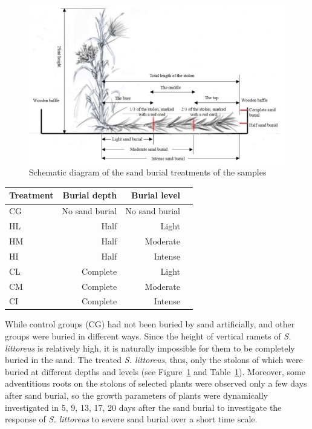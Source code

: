\documentclass[]{interact}
\theoremstyle{plain}%
\theoremstyle{definition}
\theoremstyle{remark}
\begin{document}
\begin{figure}
  \centering
  \includegraphics[scale=0.5]{../figs/diagram.jpg}
  \caption{Schematic diagram of the sand burial treatments of the samples} 
  \label{fig:diagram}
\end{figure}

\begin{table}
  {\begin{tabular}{lrrr} 
  \toprule
   Treatment & Burial depth & Burial level \\ 
  \midrule
   CG & No sand burial & No sand burial \\
   HL & Half & Light \\
   HM & Half & Moderate \\
   HI & Half & Intense \\
   CL & Complete & Light \\
   CM & Complete & Moderate \\
   CI & Complete & Intense \\
  \bottomrule
  \end{tabular}}
  \label{tab:treatment}
\end{table}

While control groups (CG) had not been buried by sand artificially, and other groups were buried in different ways. Since the height of vertical ramets of \textit{S. littoreus} is relatively high, it is naturally impossible for them to be completely buried in the sand. The treated \textit{S. littoreus}, thus, only the stolons of which were buried at different depths and levels (see Figure~\ref{fig:diagram} and Table~\ref{tab:treatment}). Moreover, some adventitious roots on the stolons of selected plants were observed only a few days after sand burial, so the growth parameters of plants were dynamically investigated in 5, 9, 13, 17, 20 days after the sand burial to investigate the response of \textit{S. littoreus} to severe sand burial over a short time scale.
\end{document}
